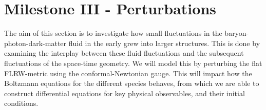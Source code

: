 \section{Milestone III - Perturbations}\label{sec:m3}

The aim of this section is to investigate how small fluctuations in the baryon-photon-dark-matter fluid in the early grew into larger structures. This is done by examining the interplay between these fluid fluctuations and the subsequent fluctuations of the space-time geometry. We will model this by perturbing the flat FLRW-metric using the conformal-Newtonian gauge. This will impact how the Boltzmann equations for the different species behaves, from which we are able to construct differential equations for key physical observables, and their initial conditions. 



